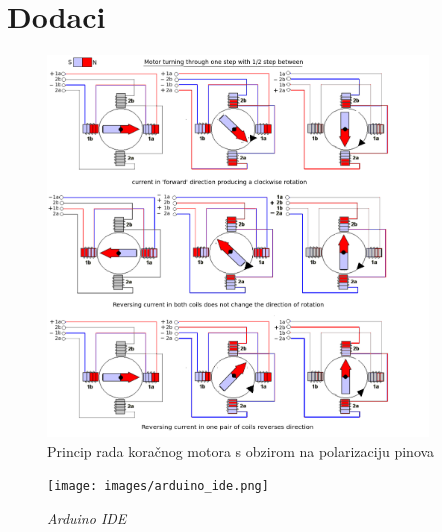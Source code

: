 \section{Dodaci}

\begin{figure}[h]
    \centering
    \includegraphics[width=0.9\textwidth]{rad_motora.png}
    \caption{Princip rada koračnog motora s obzirom na polarizaciju pinova}
    \label{fig:mesh1}
\end{figure}

\begin{figure}[h]
    \centering
    \texttt{[image: images/arduino\_ide.png]}
    \caption{\textit{Arduino IDE}}
    \label{fig:mesh1}
\end{figure}